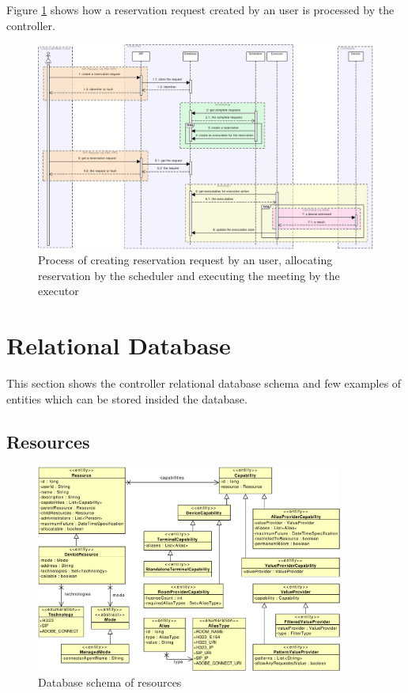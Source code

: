 Figure \ref{fig:reservation-request-processing} shows how a reservation request created by an user is processed by the controller.

\begin{figure}[b!]
\centering\includegraphics[width=\textwidth]{diagrams/sd_reservation_request_processing}
\caption{Process of creating reservation request by an user, allocating reservation by the scheduler and executing the meeting by the executor}
\label{fig:reservation-request-processing}
\end{figure}
\cleardoublepage




\section{Relational Database}

This section shows the controller relational database schema and few examples of entities which can be stored insided the database.



\subsection{Resources}

\begin{figure}[ht!]
\centering\includegraphics[width=0.9\textwidth]{diagrams/cd_resources}
\caption{Database schema of resources}
\label{fig:resources}
\end{figure}

